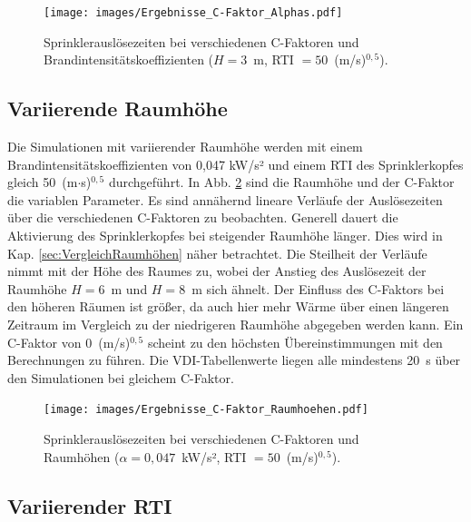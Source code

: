 \begin{figure}
    \centering
    \texttt{[image: images/Ergebnisse\_C-Faktor\_Alphas.pdf]}
    \caption{Sprinklerauslösezeiten bei verschiedenen C-Faktoren und Brand\-in\-ten\-si\-täts\-ko\-ef\-fi\-zien\-ten ($H=3$~m, RTI $=50$~(m/s)$^{0,5}$).}
    \label{fig:Ergebnisse_C-Faktor_Alphas}
\end{figure}



\subsection{Variierende Raumhöhe}

Die Simulationen mit variierender Raumhöhe werden mit einem Brandintensitätskoeffizienten von 0,047 kW/s² und einem RTI des Sprinklerkopfes gleich 50~(m$\cdot$s)$^{0,5}$ durchgeführt. In Abb. \ref{fig:Ergebnisse_C-Faktor_Raumhoehen} sind die Raumhöhe und der C-Faktor die variablen Parameter. Es sind annähernd lineare Verläufe der Auslösezeiten über die verschiedenen C-Faktoren zu beobachten. Generell dauert die Aktivierung des Sprinklerkopfes bei steigender Raumhöhe länger. Dies wird in Kap. \ref{sec:VergleichRaumhöhen} näher betrachtet. Die Steilheit der Verläufe nimmt mit der Höhe des Raumes zu, wobei der Anstieg des Auslösezeit der Raumhöhe $H=6$~m und $H=8$~m sich ähnelt. Der Einfluss des C-Faktors bei den höheren Räumen ist größer, da auch hier mehr Wärme über einen längeren Zeitraum im Vergleich zu der niedrigeren Raumhöhe abgegeben werden kann.
Ein C-Faktor von 0~(m/s)$^{0,5}$ scheint zu den höchsten Übereinstimmungen mit den Berechnungen zu führen.  Die VDI-Tabellenwerte liegen alle mindestens 20~s über den Simulationen bei gleichem C-Faktor. 


\begin{figure}
    \centering
    \texttt{[image: images/Ergebnisse\_C-Faktor\_Raumhoehen.pdf]}
    \caption{Sprinklerauslösezeiten bei verschiedenen C-Faktoren und Raumhöhen ($\alpha=0{,}047$~kW/s², RTI $=50$~(m/s)$^{0,5}$).}
    \label{fig:Ergebnisse_C-Faktor_Raumhoehen}
\end{figure}

\subsection{Variierender RTI}

